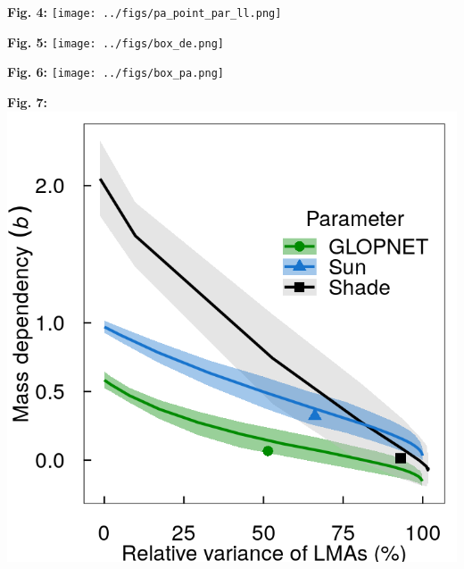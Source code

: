 \documentclass[
  12pt,
  letterpaper,
  DIV=11,
  numbers=noendperiod]{scrartcl}
\begin{document}
\textbf{Fig. 4:} \texttt{[image: ../figs/pa\_point\_par\_ll.png]} \newpage

\textbf{Fig. 5:} \texttt{[image: ../figs/box\_de.png]} \newpage

\textbf{Fig. 6:} \texttt{[image: ../figs/box\_pa.png]} \newpage

\textbf{Fig. 7:} \includegraphics{../figs/mass_prop_mv.png}
\end{document}
